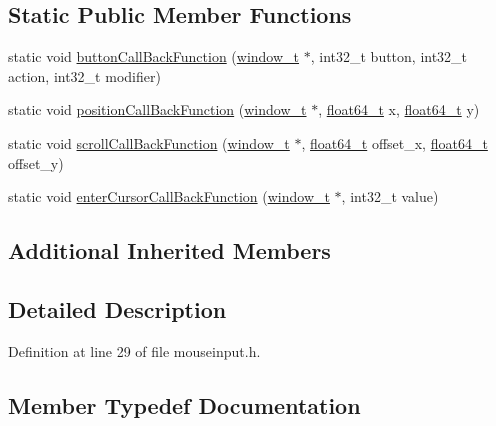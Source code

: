 \subsection*{Static Public Member Functions}
\begin{DoxyCompactItemize}
\item 
static void \hyperlink{classcrap_1_1_mouse_input_a302231a6c37a332b2b26a504c4945856}{button\+Call\+Back\+Function} (\hyperlink{namespacecrap_a3917356677c911215fe8f50465f335bf}{window\+\_\+t} $\ast$, int32\+\_\+t button, int32\+\_\+t action, int32\+\_\+t modifier)
\item 
static void \hyperlink{classcrap_1_1_mouse_input_a4910d11a022223e4916eb4f0223e95df}{position\+Call\+Back\+Function} (\hyperlink{namespacecrap_a3917356677c911215fe8f50465f335bf}{window\+\_\+t} $\ast$, \hyperlink{crap__types_8h_ac55f3ae81b5bc9053760baacf57e47f4}{float64\+\_\+t} x, \hyperlink{crap__types_8h_ac55f3ae81b5bc9053760baacf57e47f4}{float64\+\_\+t} y)
\item 
static void \hyperlink{classcrap_1_1_mouse_input_a4267d6d2e388dd49f4b01a59912e0599}{scroll\+Call\+Back\+Function} (\hyperlink{namespacecrap_a3917356677c911215fe8f50465f335bf}{window\+\_\+t} $\ast$, \hyperlink{crap__types_8h_ac55f3ae81b5bc9053760baacf57e47f4}{float64\+\_\+t} offset\+\_\+x, \hyperlink{crap__types_8h_ac55f3ae81b5bc9053760baacf57e47f4}{float64\+\_\+t} offset\+\_\+y)
\item 
static void \hyperlink{classcrap_1_1_mouse_input_a5ee160f889ea1bb525b8ed744309f4d2}{enter\+Cursor\+Call\+Back\+Function} (\hyperlink{namespacecrap_a3917356677c911215fe8f50465f335bf}{window\+\_\+t} $\ast$, int32\+\_\+t value)
\end{DoxyCompactItemize}
\subsection*{Additional Inherited Members}


\subsection{Detailed Description}


Definition at line 29 of file mouseinput.\+h.



\subsection{Member Typedef Documentation}
\hypertarget{classcrap_1_1_mouse_input_a4aef04436121adc836ded20bfe36d967}{}
